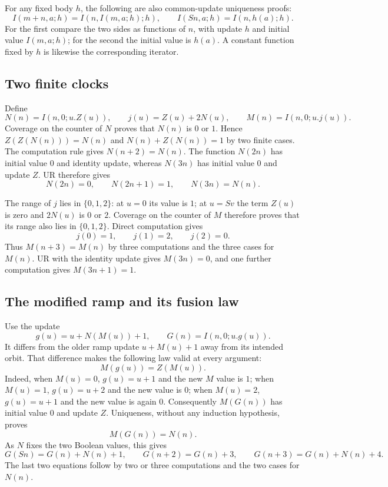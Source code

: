 For any fixed body $h$, the following are also common-update
uniqueness proofs:
\[
 I(m+n,a;h)=I(n,I(m,a;h);h),\qquad
 I(Sn,a;h)=I(n,h(a);h).
\]
For the first compare the two sides as functions of $n$, with update $h$
and initial value $I(m,a;h)$; for the second the initial value is $h(a)$.
A constant function fixed by $h$ is likewise the corresponding iterator.

\subsection{Two finite clocks}
Define
\[
 N(n)=I(n,0;u.Z(u)),\qquad j(u)=Z(u)+2N(u),\qquad
 M(n)=I(n,0;u.j(u)).
\]
Coverage on the counter of $N$ proves that $N(n)$ is $0$ or $1$.
Hence $Z(Z(N(n)))=N(n)$ and $N(n)+Z(N(n))=1$ by two finite cases.
The computation rule gives $N(n+2)=N(n)$.
The function $N(2n)$ has initial value $0$ and identity update, whereas
$N(3n)$ has initial value $0$ and update $Z$.  UR therefore gives
\[
 N(2n)=0,\qquad N(2n+1)=1,\qquad N(3n)=N(n).
\]

The range of $j$ lies in $\{0,1,2\}$: at $u=0$ its value is $1$;
at $u=Sv$ the term $Z(u)$ is zero and $2N(u)$ is $0$ or $2$.
Coverage on the counter of $M$ therefore proves that its range also lies
in $\{0,1,2\}$.  Direct computation gives
\[
 j(0)=1,\qquad j(1)=2,\qquad j(2)=0.
\]
Thus $M(n+3)=M(n)$ by three computations and the three cases for
$M(n)$.  UR with the identity update gives $M(3n)=0$, and one further
computation gives $M(3n+1)=1$.

\subsection{The modified ramp and its fusion law}
Use the update
\[
 g(u)=u+N(M(u))+1,\qquad G(n)=I(n,0;u.g(u)).
\]
It differs from the older ramp update $u+M(u)+1$ away from its intended
orbit.  That difference makes the following law valid at every argument:
\[
                         M(g(u))=Z(M(u)).                 \tag{1}
\]
Indeed, when $M(u)=0$, $g(u)=u+1$ and the new $M$ value is $1$;
when $M(u)=1$, $g(u)=u+2$ and the new value is $0$; when $M(u)=2$,
$g(u)=u+1$ and the new value is again $0$.
Consequently $M(G(n))$ has initial value $0$ and update $Z$.
Uniqueness, without any induction hypothesis, proves
\[
                             M(G(n))=N(n).                \tag{2}
\]
As $N$ fixes the two Boolean values, this gives
\[
 G(Sn)=G(n)+N(n)+1,\qquad G(n+2)=G(n)+3,
 \qquad G(n+3)=G(n)+N(n)+4.                               \tag{3}
\]
The last two equations follow by two or three computations and the
two cases for $N(n)$.

